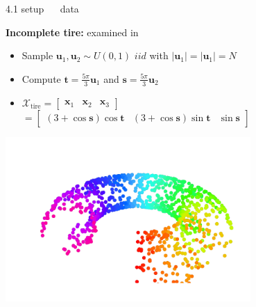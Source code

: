 \documentclass[11pt, compress, t, notes = noshow, xcolor = table, 
aspectratio = 1610]{beamer}
\newcommand{\highlight}[1]{\textcolor{highlightcol}{\textbf{#1}}}
\newcommand{\flexitem}[1]{\item[$\highlight{#1}$]}
\newcommand{\X}{\mathcal{X}}
\newcommand{\x}{\bm{x}}
\begin{document}
\begin{frame}{\textcolor{gray!90}{4.1 setup} ~~ data}
\begin{minipage}[b]{0.65\textwidth}
  \textbf{Incomplete tire:} examined in \citet{yangetal2006}
  \begin{itemize}
    \flexitem{1} Sample $\bm{u}_1, \bm{u}_2 \sim U(0, 1)$ 
    $\mathit{ iid}$ with $\rvert \bm{u}_1 \rvert = \rvert \bm{u}_1 \rvert = N$
    \flexitem{2} Compute $\bm{t} = \frac{5 \pi}{3} \bm{u}_1$ and 
    $\bm{s} = \frac{5 \pi}{3} \bm{u}_2$
    \flexitem{3} 
    $\X_{\text{tire}} =
    \begin{bmatrix} \x_1 & \x_2 & \x_3 \end{bmatrix} $ \\
    \phantom{$\X_{\text{tire}}$} $ = \begin{bmatrix} (3 + \cos{\bm{s}}) 
    \cos{\bm{t}} & (3 + \cos{\bm{s}}) \sin{\bm{t}} & \sin{\bm{s}} \end{bmatrix}$
  \end{itemize}
\end{minipage}%
\begin{minipage}[b]{0.35\textwidth}
  \centering
  \includegraphics[trim = 20 0 0 0, clip, %
    width = 0.7\textwidth]{figures/incomplete_tire}
\end{minipage}

\end{frame}

\end{document}
